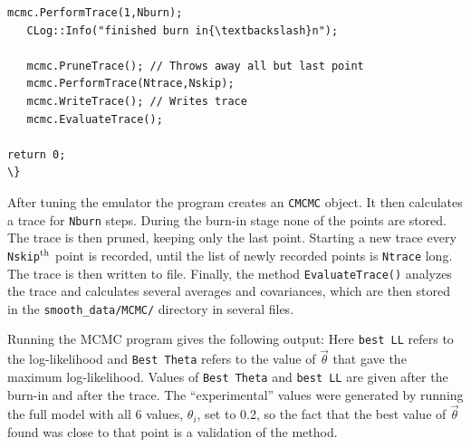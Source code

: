 \documentclass[UserManual.tex]{subfiles}
\begin{document}
\begin{sloppypar}
{\begin{Verbatim}[commandchars=\\\{\}]
   mcmc.PerformTrace(1,Nburn);     
   CLog::Info("finished burn in{\textbackslash}n");
        
   mcmc.PruneTrace(); // Throws away all but last point
   mcmc.PerformTrace(Ntrace,Nskip);
   mcmc.WriteTrace(); // Writes trace
   mcmc.EvaluateTrace();

return 0;
\}
\end{Verbatim}
}\vspace*{-8pt}
After tuning the emulator the program creates an {\tt CMCMC} object. It then calculates a trace for {\tt Nburn} steps. During the burn-in stage none of the points are stored. The trace is then pruned, keeping only the last point. Starting a new trace every {\tt Nskip}$^{\rm th}$ point is recorded, until the list of newly recorded points is {\tt Ntrace} long. The trace is then written to file. Finally, the method {\tt EvaluateTrace()} analyzes the trace and calculates several averages and covariances, which are then stored in the {\tt smooth\_data/MCMC/} directory in several files.

Running the MCMC program gives the following output:
\vspace*{-8pt}
Here {\tt best LL} refers to the log-likelihood and {\tt Best Theta} refers to the value of $\vec{\theta}$ that gave the maximum log-likelihood. Values of {\tt Best Theta} and {\tt best LL} are given after the burn-in and after the trace. The ``experimental'' values were generated by running the full model with all 6 values, $\theta_i$, set to 0.2, so the fact that the best value of $\vec{\theta}$ found was close to that point is a validation of the method.


\end{sloppypar}
\end{document}

